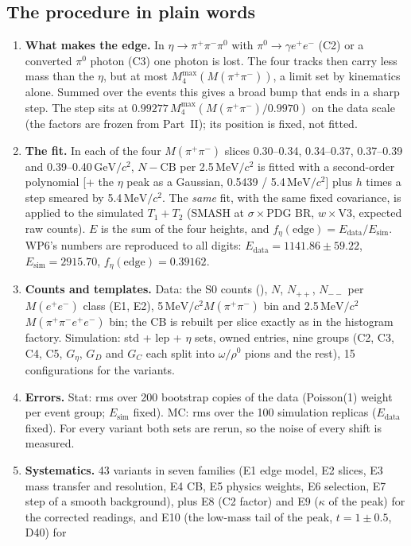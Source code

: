 \documentclass[11pt,a4paper]{article}
\newcommand{\piz}{\ensuremath{\pi^{0}}\xspace}
\newcommand{\ee}{\ensuremath{e^{+}e^{-}}\xspace}
\newcommand{\pipi}{\ensuremath{\pi^{+}\pi^{-}}\xspace}
\newcommand{\Mfour}{\ensuremath{M(\pi^{+}\pi^{-}e^{+}e^{-})}\xspace}
\newcommand{\Mee}{\ensuremath{M(e^{+}e^{-})}\xspace}
\newcommand{\Mpipi}{\ensuremath{M(\pi^{+}\pi^{-})}\xspace}
\newcommand{\GeVcc}{\ensuremath{\mathrm{GeV}/c^{2}}\xspace}
\newcommand{\MeVcc}{\ensuremath{\mathrm{MeV}/c^{2}}\xspace}
\newcommand{\code}[1]{\texttt{\detokenize{#1}}}
\newcommand{\Geta}{\ensuremath{G_\eta}\xspace}
\begin{document}
\subsection{The procedure in plain words}
\label{sec:bedge-proc}
\begin{enumerate}\setlength{\itemsep}{1pt}
\item \textbf{What makes the edge.} In $\eta\to\pipi\piz$ with $\piz\to\gamma\ee$ (C2) or a converted \piz photon (C3) one photon is lost. The
      four tracks then carry less mass than the $\eta$, but at most $M_4^{\max}(\Mpipi)$, a limit set by kinematics alone. Summed over the
      events this gives a broad bump that ends in a sharp step. The step sits at $0.99277\,M_4^{\max}(\Mpipi/0.9970)$ on the data scale (the
      factors are frozen from Part~II); its position is fixed, not fitted.
\item \textbf{The fit.} In each of the four \Mpipi slices 0.30--0.34, 0.34--0.37, 0.37--0.39 and 0.39--0.40\,\GeVcc, $N-\mathrm{CB}$ per 2.5\,\MeVcc
      is fitted with a second-order polynomial [+ the $\eta$ peak as a Gaussian, 0.5439 / 5.4\,\MeVcc] plus $h$ times a step smeared by
      5.4\,\MeVcc. The \emph{same} fit, with the same fixed covariance, is applied to the simulated $T_1+T_2$ (SMASH at $\sigma\times$PDG BR,
      $w\times$V3, expected raw counts). $E$ is the sum of the four heights, and $f_\eta(\mathrm{edge})=E_{\mathrm{data}}/E_{\mathrm{sim}}$. WP6's
      numbers are reproduced to all digits: $E_{\mathrm{data}}=1141.86\pm59.22$, $E_{\mathrm{sim}}=2915.70$, $f_\eta(\mathrm{edge})=0.39162$.
\item \textbf{Counts and templates.} Data: the S0 counts (\code{cor_ok}), $N$, $N_{++}$, $N_{--}$ per \Mee class (E1, E2), 5\,\MeVcc \Mpipi bin and
      2.5\,\MeVcc \Mfour bin; the CB is rebuilt per slice exactly as in the histogram factory. Simulation: std + lep + $\eta$ sets, owned entries,
      nine groups (C2, C3, C4, C5, \Geta, $G_D$ and $G_C$ each split into $\omega/\rho^0$ pions and the rest), 15 configurations for the variants.
\item \textbf{Errors.} Stat: rms over 200 bootstrap copies of the data (Poisson(1) weight per event group; $E_{\mathrm{sim}}$ fixed). MC: rms over
      the 100 simulation replicas ($E_{\mathrm{data}}$ fixed). For every variant both sets are rerun, so the noise of every shift is measured.
\item \textbf{Systematics.} 43 variants in seven families (E1 edge model, E2 slices, E3 mass transfer and resolution, E4 CB, E5 physics weights,
      E6 selection, E7 step of a smooth background), plus E8 (C2 factor) and E9 ($\kappa$ of the peak) for the corrected readings, and E10 (the low-mass tail of the peak, $t=1\pm0.5$, D40) for

\end{enumerate}
\end{document}
